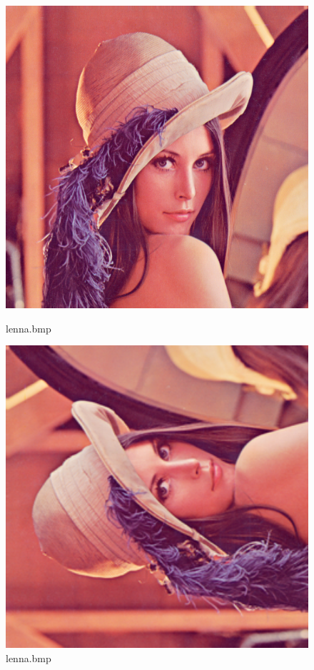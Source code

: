\documentclass[12pt, a4paper]{article}
\begin{document}
\begin{figure}[H]
    \centering
    \begin{minipage}[b]{0.45\textwidth}
        \centering
        \includegraphics[width=1\textwidth]{images/lenna.png}
        \caption{lenna.bmp}
        \label{fig:lenna}
    \end{minipage}
    \hfill
    \begin{minipage}[b]{0.45\textwidth}
        \centering
        \includegraphics[width=1\textwidth]{images/output_lenna.png} 
        \caption{lenna.bmp}
        \label{fig:lenna_output}
    \end{minipage}
\end{figure}
\end{document}
